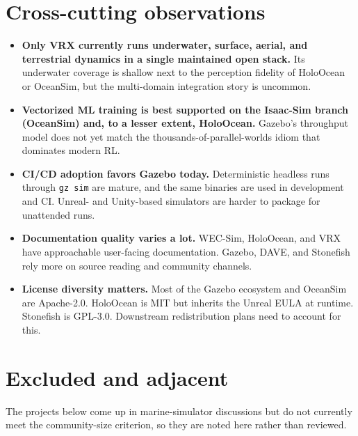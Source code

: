 \documentclass[11pt]{article}
\begin{document}
\section{Cross-cutting observations}
\label{sec:observations}

\begin{itemize}[leftmargin=*]
  \item \textbf{Only VRX currently runs underwater, surface, aerial, and terrestrial dynamics in a single maintained open stack.} Its underwater coverage is shallow next to the perception fidelity of HoloOcean or OceanSim, but the multi-domain integration story is uncommon.
  \item \textbf{Vectorized ML training is best supported on the Isaac-Sim branch (OceanSim) and, to a lesser extent, HoloOcean.} Gazebo's throughput model does not yet match the thousands-of-parallel-worlds idiom that dominates modern RL.
  \item \textbf{CI/CD adoption favors Gazebo today.} Deterministic headless runs through \texttt{gz sim} are mature, and the same binaries are used in development and CI. Unreal- and Unity-based simulators are harder to package for unattended runs.
  \item \textbf{Documentation quality varies a lot.} WEC-Sim, HoloOcean, and VRX have approachable user-facing documentation. Gazebo, DAVE, and Stonefish rely more on source reading and community channels.
  \item \textbf{License diversity matters.} Most of the Gazebo ecosystem and OceanSim are Apache-2.0. HoloOcean is MIT but inherits the Unreal EULA at runtime. Stonefish is GPL-3.0. Downstream redistribution plans need to account for this.
\end{itemize}

\section{Excluded and adjacent}
\label{sec:excluded}

The projects below come up in marine-simulator discussions but do not currently meet the community-size criterion, so they are noted here rather than reviewed.
\end{document}
